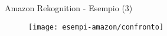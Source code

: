 %
\begin{frame}[t]{Amazon Rekognition - Esempio (3)}
	\begin{figure}[h]
	\centering
	    \texttt{[image: esempi-amazon/confronto]}
		\label{fig:esempio-amazon}
	\end{figure}
\end{frame}
%
